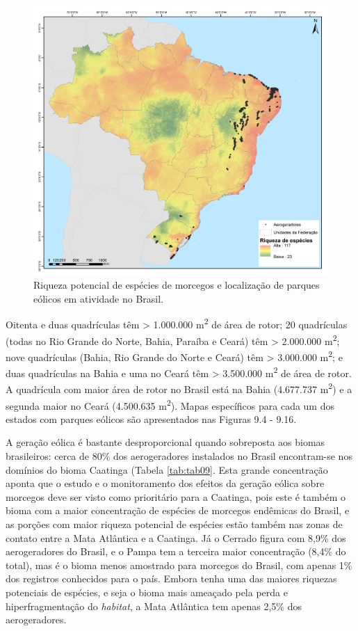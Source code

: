 \documentclass[
  oneside]{scrbook}
\begin{document}
\begin{figure}[H]

{\centering \includegraphics[width=0.75\linewidth]{imagens/cap09/Figura_9.3} 

}

\caption{Riqueza potencial de espécies de morcegos e localização de parques eólicos em atividade no Brasil.}\label{fig:69}
\end{figure}

Oitenta e duas quadrículas têm \textgreater{} 1.000.000 m\textsuperscript{2} de área de rotor; 20 quadrículas (todas no Rio Grande do Norte, Bahia, Paraíba e Ceará) têm \textgreater{} 2.000.000 m\textsuperscript{2}; nove quadrículas (Bahia, Rio Grande do Norte e Ceará) têm \textgreater{} 3.000.000 m\textsuperscript{2}; e duas quadrículas na Bahia e uma no Ceará têm \textgreater{} 3.500.000 m\textsuperscript{2} de área de rotor. A quadrícula com maior área de rotor no Brasil está na Bahia (4.677.737 m\textsuperscript{2}) e a segunda maior no Ceará (4.500.635 m\textsuperscript{2}). Mapas específicos para cada um dos estados com parques eólicos são apresentados nas Figuras 9.4 - 9.16.

A geração eólica é bastante desproporcional quando sobreposta aos biomas brasileiros: cerca de 80\% dos aerogeradores instalados no Brasil encontram-se nos domínios do bioma Caatinga (Tabela \ref{tab:tab09}. Esta grande concentração aponta que o estudo e o monitoramento dos efeitos da geração eólica sobre morcegos deve ser visto como prioritário para a Caatinga, pois este é também o bioma com a maior concentração de espécies de morcegos endêmicas do Brasil, e as porções com maior riqueza potencial de espécies estão também nas zonas de contato entre a Mata Atlântica e a Caatinga. Já o Cerrado figura com 8,9\% dos aerogeradores do Brasil, e o Pampa tem a terceira maior concentração (8,4\% do total), mas é o bioma menos amostrado para morcegos do Brasil, com apenas 1\% dos registros conhecidos para o país. Embora tenha uma das maiores riquezas potenciais de espécies, e seja o bioma mais ameaçado pela perda e hiperfragmentação do \emph{habitat}, a Mata Atlântica tem apenas 2,5\% dos aerogeradores.
\end{document}
